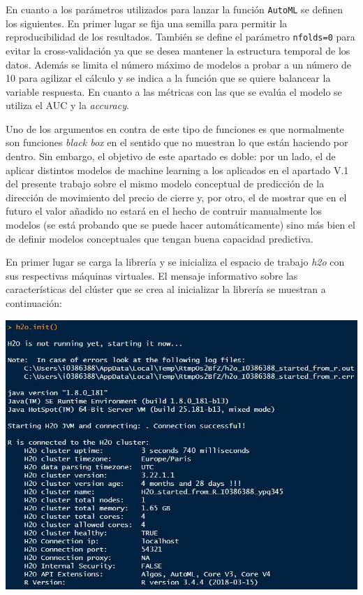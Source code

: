 \documentclass[]{DissertateUSU}
\begin{document}
\noindent En cuanto a los parámetros utilizados para lanzar la función
\texttt{AutoML} se definen los siguientes. En primer lugar se fija una
semilla para permitir la reproducibilidad de los resultados. También se
define el parámetro \texttt{nfolds=0} para evitar la cross-validación ya
que se desea mantener la estructura temporal de los datos. Además se
limita el número máximo de modelos a probar a un número de 10 para
agilizar el cálculo y se indica a la función que se quiere balancear la
variable respuesta. En cuanto a las métricas con las que se evalúa el
modelo se utiliza el AUC y la \emph{accuracy}.

\noindent Uno de los argumentos en contra de este tipo de funciones es
que normalmente son funciones \emph{black box} en el sentido que no
muestran lo que están haciendo por dentro. Sin embargo, el objetivo de
este apartado es doble: por un lado, el de aplicar distintos modelos de
machine learning a los aplicados en el apartado V.1 del presente trabajo
sobre el mismo modelo conceptual de predicción de la dirección de
movimiento del precio de cierre y, por otro, el de mostrar que en el
futuro el valor añadido no estará en el hecho de contruir manualmente
los modelos (se está probando que se puede hacer automáticamente) sino
más bien el de definir modelos conceptuales que tengan buena capacidad
predictiva.

\noindent En primer lugar se carga la librería y se inicializa el
espacio de trabajo \emph{h2o} con sus respectivas máquinas virtuales. El
mensaje informativo sobre las características del clúster que se crea al
inicializar la librería se muestran a continuación:

\setlength\parskip{5ex}
\centering

\includegraphics{h2o.png} \centering
{}
\end{document}
